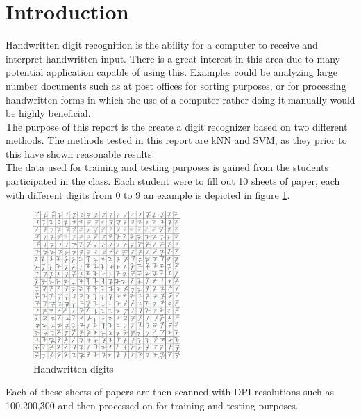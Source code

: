 \section{Introduction}
Handwritten digit recognition is the ability for a computer to receive and interpret handwritten input. There is a great interest in this area due to many potential application capable of using this. Examples could be analyzing large number documents such as at post offices for sorting purposes, or for processing handwritten forms in which the use of a computer rather doing it manually would be highly beneficial.  \\

The purpose of this report is the create a digit recognizer based on two different methods.  The methods tested in this report are kNN and SVM, as they prior to this have shown reasonable results.\\

The data used for training and testing purposes is gained from the students participated in the class.  Each student were to fill out 10 sheets of paper, each with different digits from 0 to 9 an example is depicted in figure \ref{fig:handwriten_digits}. 

\begin{figure}[H]
\centering
\includegraphics[width = 0.5\textwidth]{img/cropY2016G2M1-100-7.png}
\caption{Handwritten digits}
\label{fig:handwriten_digits}
\end{figure}

Each of these sheets of papers are then scanned with DPI resolutions such as 100,200,300 and then processed on for training and testing purposes. 
\newpage
